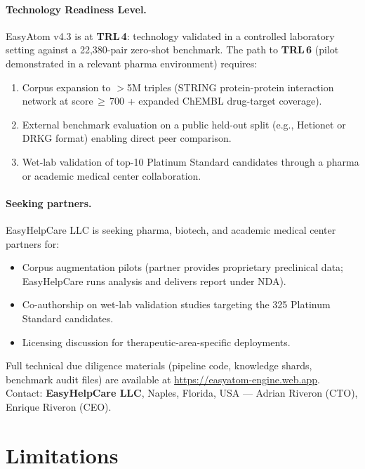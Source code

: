 \documentclass[11pt]{article}
\begin{document}
\paragraph{Technology Readiness Level.}
EasyAtom v4.3 is at \textbf{TRL\,4}:
technology validated in a controlled laboratory setting against
a 22,380-pair zero-shot benchmark.
The path to \textbf{TRL\,6} (pilot demonstrated in a relevant pharma
environment) requires:
\begin{enumerate}[noitemsep]
  \item Corpus expansion to $>$5M triples (STRING protein-protein
    interaction network at score\,$\geq$\,700 + expanded ChEMBL
    drug-target coverage).
  \item External benchmark evaluation on a public held-out split
    (e.g., Hetionet or DRKG format) enabling direct peer comparison.
  \item Wet-lab validation of top-10 Platinum Standard candidates
    through a pharma or academic medical center collaboration.
\end{enumerate}

\paragraph{Seeking partners.}
EasyHelpCare LLC is seeking pharma, biotech, and academic medical center
partners for:
\begin{itemize}[noitemsep]
  \item Corpus augmentation pilots (partner provides proprietary
    preclinical data; EasyHelpCare runs analysis and delivers report
    under NDA).
  \item Co-authorship on wet-lab validation studies targeting the
    325 Platinum Standard candidates.
  \item Licensing discussion for therapeutic-area-specific deployments.
\end{itemize}
Full technical due diligence materials (pipeline code, knowledge shards,
benchmark audit files) are available at
\url{https://easyatom-engine.web.app}.\\
Contact: \textbf{EasyHelpCare LLC}, Naples, Florida, USA ---
Adrian Riveron (CTO), Enrique Riveron (CEO).

\section{Limitations}
\label{sec:limitations}
\end{document}
